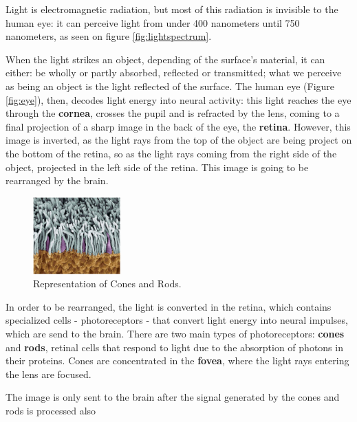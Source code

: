\documentclass{report}
\begin{document}
%
Light is electromagnetic radiation, but most of this radiation is invisible to the human eye: it can
perceive light from under 400 nanometers until 750 nanometers, as seen on figure \ref{fig:lightspectrum}. \par 
When the light strikes an object, depending of the surface’s material, it can either: be wholly or partly
absorbed, reflected or transmitted; what we perceive as being an object is the light reflected of the
surface. The human eye (Figure \ref{fig:eye}), then, decodes light energy into neural activity: 
this light reaches the eye through the \textbf{cornea}, crosses the pupil and is refracted by the lens, coming to a final
projection of a sharp image in the back of the eye, the \textbf{retina}. However, this image is
inverted, as the light rays from the top of the object are being project on the bottom of the retina,
so as the light rays coming from the right side of the object, projected in the left side of the
retina. This image is going to be rearranged by the brain.  \par
%
\begin{figure}
	\centering
    \vspace{-\baselineskip}
	\includegraphics[width=0.3\textwidth]{Eye_ConesRods.png}
    \caption[Cones and Rods]{Representation of Cones and Rods.\protect\footnotemark{}}
    \label{fig:conesrods}
\end{figure}
%
In order to be rearranged, the light is converted in the retina, which contains specialized cells 
- photoreceptors - that convert light energy into neural impulses,
which are send to the brain. There are two main types of photoreceptors: \textbf{cones} and
\textbf{rods},
retinal cells that respond to light due to the absorption of photons in their proteins. Cones are concentrated in the \textbf{fovea}, where the light rays
entering the lens are focused. \par
The image is only sent to the brain after the signal generated by the cones and rods is processed also
\end{document}
